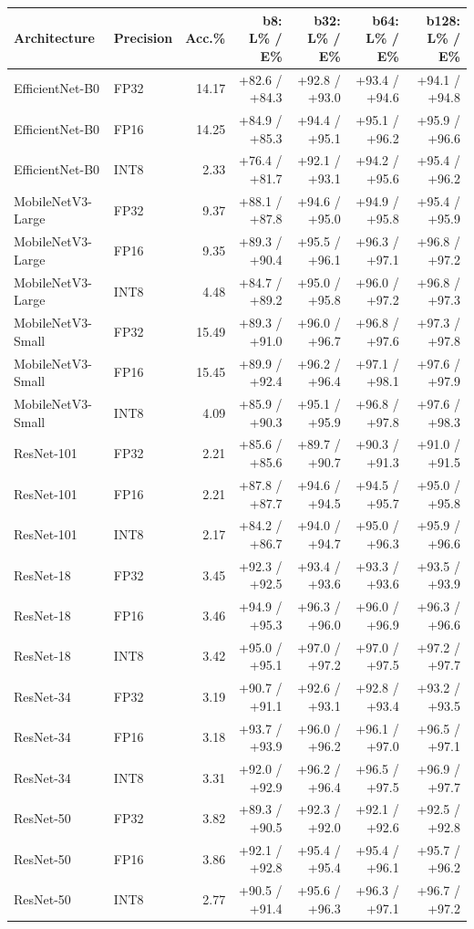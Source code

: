 \begin{tabular}{@{}llrrrrr@{}}
\toprule
Architecture & Precision & Acc.\% & b8: L\% / E\% & b32: L\% / E\% & b64: L\% / E\% & b128: L\% / E\%\\\midrule
EfficientNet-B0 & FP32 & 14.17 & +82.6 / +84.3 & +92.8 / +93.0 & +93.4 / +94.6 & +94.1 / +94.8\\
EfficientNet-B0 & FP16 & 14.25 & +84.9 / +85.3 & +94.4 / +95.1 & +95.1 / +96.2 & +95.9 / +96.6\\
EfficientNet-B0 & INT8 & 2.33 & +76.4 / +81.7 & +92.1 / +93.1 & +94.2 / +95.6 & +95.4 / +96.2\\
MobileNetV3-Large & FP32 & 9.37 & +88.1 / +87.8 & +94.6 / +95.0 & +94.9 / +95.8 & +95.4 / +95.9\\
MobileNetV3-Large & FP16 & 9.35 & +89.3 / +90.4 & +95.5 / +96.1 & +96.3 / +97.1 & +96.8 / +97.2\\
MobileNetV3-Large & INT8 & 4.48 & +84.7 / +89.2 & +95.0 / +95.8 & +96.0 / +97.2 & +96.8 / +97.3\\
MobileNetV3-Small & FP32 & 15.49 & +89.3 / +91.0 & +96.0 / +96.7 & +96.8 / +97.6 & +97.3 / +97.8\\
MobileNetV3-Small & FP16 & 15.45 & +89.9 / +92.4 & +96.2 / +96.4 & +97.1 / +98.1 & +97.6 / +97.9\\
MobileNetV3-Small & INT8 & 4.09 & +85.9 / +90.3 & +95.1 / +95.9 & +96.8 / +97.8 & +97.6 / +98.3\\
ResNet-101 & FP32 & 2.21 & +85.6 / +85.6 & +89.7 / +90.7 & +90.3 / +91.3 & +91.0 / +91.5\\
ResNet-101 & FP16 & 2.21 & +87.8 / +87.7 & +94.6 / +94.5 & +94.5 / +95.7 & +95.0 / +95.8\\
ResNet-101 & INT8 & 2.17 & +84.2 / +86.7 & +94.0 / +94.7 & +95.0 / +96.3 & +95.9 / +96.6\\
ResNet-18 & FP32 & 3.45 & +92.3 / +92.5 & +93.4 / +93.6 & +93.3 / +93.6 & +93.5 / +93.9\\
ResNet-18 & FP16 & 3.46 & +94.9 / +95.3 & +96.3 / +96.0 & +96.0 / +96.9 & +96.3 / +96.6\\
ResNet-18 & INT8 & 3.42 & +95.0 / +95.1 & +97.0 / +97.2 & +97.0 / +97.5 & +97.2 / +97.7\\
ResNet-34 & FP32 & 3.19 & +90.7 / +91.1 & +92.6 / +93.1 & +92.8 / +93.4 & +93.2 / +93.5\\
ResNet-34 & FP16 & 3.18 & +93.7 / +93.9 & +96.0 / +96.2 & +96.1 / +97.0 & +96.5 / +97.1\\
ResNet-34 & INT8 & 3.31 & +92.0 / +92.9 & +96.2 / +96.4 & +96.5 / +97.5 & +96.9 / +97.7\\
ResNet-50 & FP32 & 3.82 & +89.3 / +90.5 & +92.3 / +92.0 & +92.1 / +92.6 & +92.5 / +92.8\\
ResNet-50 & FP16 & 3.86 & +92.1 / +92.8 & +95.4 / +95.4 & +95.4 / +96.1 & +95.7 / +96.2\\
ResNet-50 & INT8 & 2.77 & +90.5 / +91.4 & +95.6 / +96.3 & +96.3 / +97.1 & +96.7 / +97.2\\
\bottomrule
\end{tabular}
